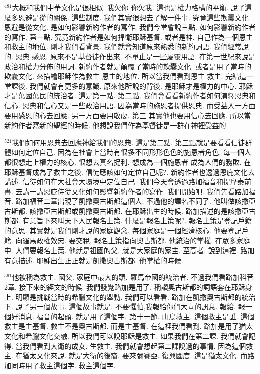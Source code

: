 \documentclass{book}
\begin{document}
$^{481}$大概和我們中華文化是很相似.
我欠你 你欠我.
這也是權力格構的平衡.
說了這麼多恩避是從的關係.
這些制度.
我們其實很想去了解一件事.
究竟這些欺囊文化 恩避是從文化.
是如何影響新約作者的寫作.
我們今堂會說三點.
如何影響新約作者的寫作.
第一點.
究竟新約作者是如何捍衛耶穌基督.
或者是神.
自己作為一個恩主和救主的地位.
剛才我們看背景.
我們就會知道原來熟悉的新約詞語.
我們經常說的.
恩典 感恩.
原來不是基督徒作出來.
不單止是一些屬靈用語.
在第一世紀來說是政治和權力分佈的用詞.
新約作者就是顛覆了當時的欺囊文化.
或者是用了當時的欺囊文化.
來描繪耶穌作為救主 恩主的地位.
所以當我們看到恩主 救主.
完結這一堂課後.
我們就會有更多的意識.
原來他所說的背後.
是耶穌才是權力的中心.
耶穌才是萬國萬民的統治者.
這是第一點.
第二點.
我們會看看新約作者如何演繹恩典和信心.
恩典和信心又是一些政治用語.
因為當時的施恩者提供恩典.
而受益人一方面要用感恩的心去回應.
另一方面要用敬虔.
第三 其實他也要用信心去回應.
所以當新約作者寫新的聖經的時候.
他想說我們作為基督徒是一群在神裡受益的.

$^{521}$我們如何用恩典去回應神給我們的恩典.
這是第二點.
第三點就是要看看信徒群體如何定位自己.
因為在社會上當時有很多不同形形色色的施恩者角色.
每一個人都很想走上權力的核心.
很想去真名捉利.
想成為一個施恩者 成為人們的務敗.
在耶穌基督成為了救主之後.
信徒應該如何定位自己呢?.
新約作者也透過恩庇文化去講述.
信徒如何在大社會大環境中定位自己.
我們今天會透過路加福音和提摩泰前書.
去講一講恩庇侍從文化如何影響新約作者的寫作.
我們開始吧.
我們先看路加福音.
路加福音二章出現了凱撒奧古斯都這個人.
不過他的譯名不同了.
他叫做該撒亞古斯都.
該撒亞古斯都或凱撒奧古斯都.
在耶穌出生的時候.
路加描述的是該撒亞古斯都.
有意旨下來叫天下人民報名上策.
什麼是報名上策呢?.
報名上策是登記戶籍的意思.
其實就是我們剛才說的家庭觀念.
每個家庭是一個經濟核心.
他要登記戶籍.
向羅馬政權效忠.
要交稅.
報名上策指向奧古斯都.
他統治的掌權.
在眾多家庭中.
人們要報名上策.
他就是祖國的父.
就是大家庭的家主.
至高者.
說到這裡.
路加有意描述.
耶穌出生正正就是凱撒奧古斯都.
他掌權的時候.

$^{561}$他被稱為救主.
國父.
家庭中最大的頭.
羅馬帝國的統治者.
不過我們看路加科音2章.
接下來的經文的時候.
我們發覺路加是用了.
稱讚奧古斯都的詞語套在耶穌身上.
明顯是挑戰當時的希臘文化的舉動.
我們可以看看.
路加在凱撒奧古斯都的統治下.
說了另一個故事.
這個故事就是.
不要懼怕,我報給你們大喜的訊息.
報給.
報一個好消息.
福音的起頭.
就是用了這個字.
第十一節.
山鳥救主.
這個救主是誰.
這個救主是主基督.
救主不是奧古斯都.
而是主基督.
在這裡我們看到.
路加是用了猶太文化和希臘文化交融.
所以我們可以說耶穌是救主.
如果我們在第二課.
我們就會記得.
當我們看到大衛的成女.
生救主.
我們就會想起第二課說過的事情.
因為這個救主.
在猶太文化來說.
就是大衛的後裔.
要來彌賽亞.
復興國度.
這是猶太文化.
而路加同時用了救主這個字.
救主這個字.
\end{document}
